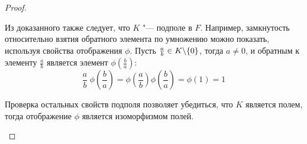 \begin{proof}
\begin{enumerate}
		Из доказанного также следует, что $K$ "--- подполе в $F$. Например, замкнутость относительно взятия обратного элемента по умножению можно показать, используя свойства отображения $\phi$. Пусть $\frac ab \in K \backslash \{0\}$, тогда $a \ne 0$, и обратным к элементу $\frac ab$ является элемент $\phi(\frac ba)$:
		\[\frac ab\hspace{3pt}\phi\left(\frac{b}{a}\right) = \phi\left(\frac{a}{b}\right)\phi\left(\frac{b}{a}\right) = \phi(1) = 1\]
		
		Проверка остальных свойств подполя позволяет убедиться, что $K$ является полем, тогда отображение $\phi$ является изоморфизмом полей.\qedhere
	\end{enumerate}
\end{proof}